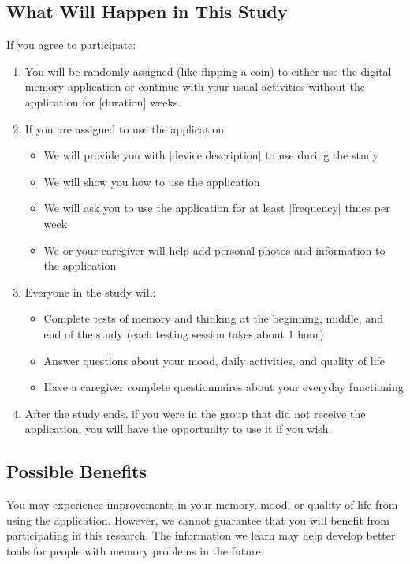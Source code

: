 \subsection{What Will Happen in This Study}
If you agree to participate:
\begin{enumerate}
    \item You will be randomly assigned (like flipping a coin) to either use the digital memory application or continue with your usual activities without the application for [duration] weeks.
    
    \item If you are assigned to use the application:
    \begin{itemize}
        \item We will provide you with [device description] to use during the study
        \item We will show you how to use the application
        \item We will ask you to use the application for at least [frequency] times per week
        \item We or your caregiver will help add personal photos and information to the application
    \end{itemize}
    
    \item Everyone in the study will:
    \begin{itemize}
        \item Complete tests of memory and thinking at the beginning, middle, and end of the study (each testing session takes about 1 hour)
        \item Answer questions about your mood, daily activities, and quality of life
        \item Have a caregiver complete questionnaires about your everyday functioning
    \end{itemize}
    
    \item After the study ends, if you were in the group that did not receive the application, you will have the opportunity to use it if you wish.
\end{enumerate}

\subsection{Possible Benefits}
You may experience improvements in your memory, mood, or quality of life from using the application. However, we cannot guarantee that you will benefit from participating in this research. The information we learn may help develop better tools for people with memory problems in the future.

